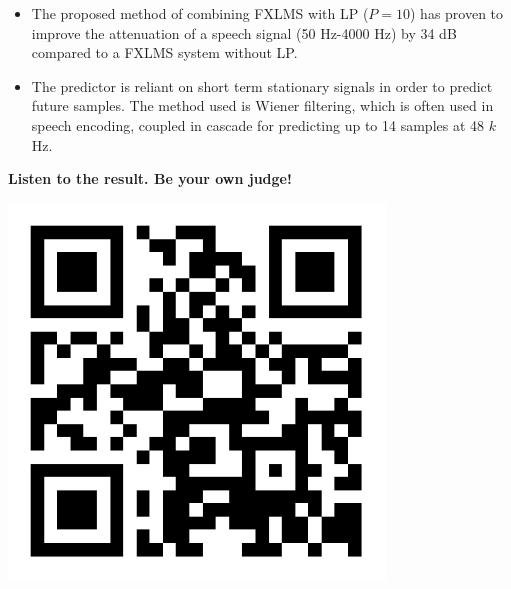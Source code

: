 \begin{itemize}
	\item The proposed method of combining FXLMS with LP ($P=10$) has proven to improve the attenuation of a speech signal (50 Hz-4000 Hz) by 34 dB compared to a FXLMS system without LP.
	\item The predictor is reliant on short term stationary signals in order to predict future samples. The method used is Wiener filtering, which is often used in speech encoding, coupled in cascade for predicting up to 14 samples at 48 $k$Hz.
\end{itemize}

 \begin{minipage}{.4\columnwidth}
 	\textbf{Listen to the result. Be your own judge!}
 \end{minipage}%
 \begin{minipage}{0.5\columnwidth}
 	\includegraphics[width=0.75\textwidth]{figures/QRCODE.pdf}
 \end{minipage}